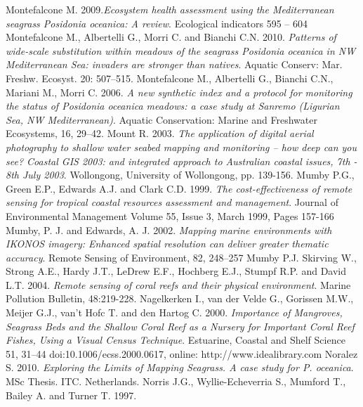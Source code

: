 \documentclass[10pt, a4paper]{article}
\begin{document}
\begin{thebibliography}{999}
Montefalcone M. 2009.\emph{Ecosystem health assessment using the Mediterranean seagrass
\textit{{Posidonia oceanica}}: A review}. Ecological indicators 595 – 604 \pageref{Montefalcone09}
Montefalcone M., Albertelli G., Morri C. and Bianchi C.N. 2010. \emph{Patterns of wide-scale
substitution within meadows of the seagrass \textit{{Posidonia oceanica}} in NW Mediterranean Sea:
invaders are stronger than natives}. Aquatic Conserv: Mar. Freshw. Ecosyst. 20: 507–515. \pageref{Montefalcone10}
Montefalcone M., Albertelli G., Bianchi C.N., Mariani M., Morri C. 2006. \emph{A new
synthetic index and a protocol for monitoring the status of \textit{{Posidonia oceanica}} meadows: a
case study at Sanremo (Ligurian Sea, NW Mediterranean)}. Aquatic Conservation: Marine and
Freshwater Ecosystems, 16, 29–42. \pageref{Montefalcone06}
Mount R. 2003. \emph{The application of digital aerial photography to shallow water seabed
mapping and monitoring – how deep can you see? Coastal GIS 2003: and integrated
approach to Australian coastal issues, 7th - 8th July 2003}. Wollongong, University of
Wollongong, pp. 139-156. \pageref{Mount03}
Mumby P.G., Green E.P., Edwards A.J. and Clark C.D. 1999. \emph{The cost-effectiveness of
remote sensing for tropical coastal resources assessment and management}. Journal of
Environmental Management Volume 55, Issue 3, March 1999, Pages 157-166 \pageref{Mumby99}
Mumby, P. J. and Edwards, A. J. 2002. \emph{Mapping marine environments with IKONOS
imagery: Enhanced spatial resolution can deliver greater thematic accuracy}. Remote
Sensing of Environment, 82, 248–257 \pageref{Mumby02}
Mumby P.J. Skirving W., Strong A.E., Hardy J.T., LeDrew E.F., Hochberg E.J., Stumpf
R.P. and David L.T. 2004. \emph{Remote sensing of coral reefs and their physical environment}.
Marine Pollution Bulletin, 48:219-228. \pageref{Mumby04}
Nagelkerken I., van der Velde G., Gorissen M.W., Meijer G.J., van’t Hofc T. and den
Hartog C. 2000. \emph{Importance of Mangroves, Seagrass Beds and the Shallow Coral Reef as a
Nursery for Important Coral Reef Fishes, Using a Visual Census Technique}. Estuarine,
Coastal and Shelf Science 51, 31–44 doi:10.1006/ecss.2000.0617, online:
http://www.idealibrary.com \pageref{Nagelkerken00}
Noralez S. 2010. \emph{Exploring the Limits of Mapping Seagrass. A case study for P.
oceanica}. MSc Thesis. ITC. Netherlands. \pageref{Noralez10}
Norris J.G., Wyllie-Echeverria S., Mumford T., Bailey A. and Turner T. 1997.

\end{thebibliography}
\end{document}
